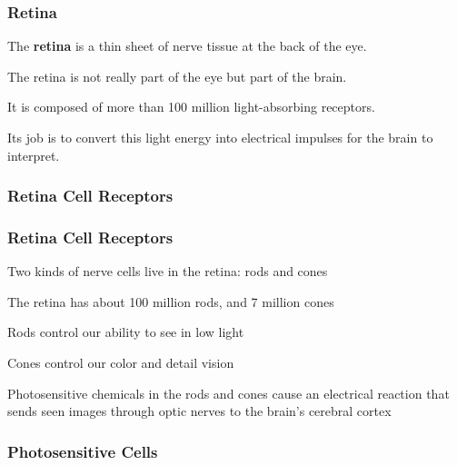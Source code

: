 \documentclass[12pt]{beamer}\usepackage[]{graphicx}\usepackage[]{color}
\begin{document}
\begin{frame}
\frametitle{Retina}

\bbi
  \item The \textbf{retina} is a thin sheet of nerve tissue at the back of the 
  eye.
  \item The retina is not really part of the eye but part of the brain.
  \item It is composed of more than 100 million light-absorbing receptors.
  \item Its job is to convert this light energy into electrical impulses
  for the brain to interpret.
\ei

\end{frame}


\begin{frame}
\frametitle{Retina Cell Receptors}
\begin{center}
\end{center}
\end{frame}


\begin{frame}
\frametitle{Retina Cell Receptors}

\bbi
  \item Two kinds of nerve cells live in the retina: rods and cones
  \item The retina has about 100 million rods, and 7 million cones
  \item Rods control our ability to see in low light
  \item Cones control our color and detail vision
  \item Photosensitive chemicals in the rods and cones cause an electrical
  reaction that sends seen images through optic nerves to the brain's cerebral
  cortex
\ei

\end{frame}


\begin{frame}
\frametitle{Photosensitive Cells}
\begin{center}
\end{center}
\end{frame}

\end{document}
